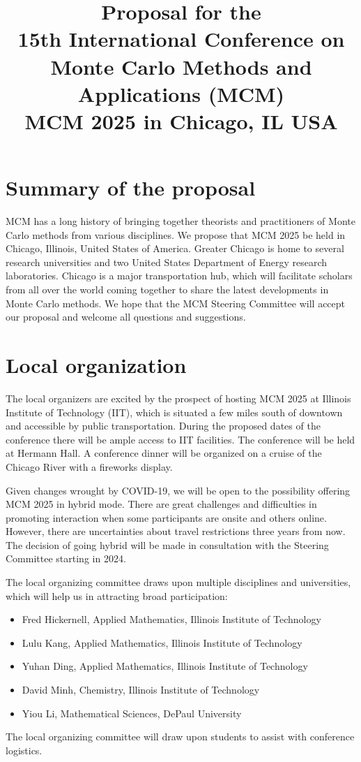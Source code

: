 \documentclass{article}
\title{Proposal for the \\
15th International Conference on Monte Carlo Methods and Applications (MCM)\\
MCM 2025 in Chicago, IL USA}
\begin{document}
\maketitle

\section{Summary of the proposal}
MCM has a long history of bringing together theorists and practitioners of Monte Carlo methods from various disciplines.  We propose that MCM 2025 be held in Chicago, Illinois, United States of America.  Greater Chicago is home to several research universities and two United States Department of Energy research laboratories.  Chicago is a major transportation hub, which will facilitate scholars from all over the world coming together to share the latest developments in Monte Carlo methods. We hope that the MCM Steering Committee will accept our proposal and welcome all questions and suggestions.

\section{Local organization}
The local organizers are excited by the prospect of hosting MCM 2025 at Illinois Institute of Technology (IIT), which is situated a few miles south of downtown and accessible by public transportation. During the proposed dates of the conference there will be ample access to IIT facilities.  The conference will be held at Hermann Hall. A conference dinner will be organized on a cruise of the Chicago River with a fireworks display. 

Given changes wrought by COVID-19, we will be open to the possibility offering MCM 2025 in hybrid mode.  There are great challenges and difficulties in promoting interaction when some participants are onsite and others online.  However, there are uncertainties about travel restrictions three years from now.  The decision of going hybrid will be made in consultation with the Steering Committee starting in 2024.

The local organizing committee draws upon multiple disciplines and universities, which will help us in attracting broad participation:
\begin{itemize}
    \item  Fred Hickernell, Applied Mathematics, Illinois Institute of Technology
    \item  Lulu Kang, Applied Mathematics, Illinois Institute of Technology
    \item  Yuhan Ding, Applied Mathematics, Illinois Institute of Technology
    \item  David Minh, Chemistry, Illinois Institute of Technology
    \item  Yiou Li, Mathematical Sciences, DePaul University
\end{itemize}
The local organizing committee will draw upon students to assist with conference logistics.
\end{document}
